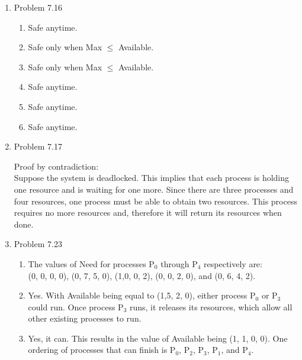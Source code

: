 \documentclass[a4paper,11pt]{article}
\theoremstyle{mytheor}
\begin{document}
\begin{enumerate}
\pagebreak
\item {Problem 7.16}
    \par 
    \begin{enumerate}
    \item Safe anytime.
    \item Safe only when Max $\leq$ Available.
    \item Safe only when Max $\leq$ Available.
    \item Safe anytime.
    \item Safe anytime.
    \item Safe anytime.
    \end{enumerate}
\item{Problem 7.17}    
    \par 
    Proof by contradiction:\\
    Suppose the system is deadlocked. This implies that each process is holding one resource and is waiting for one more. Since there are three processes and four resources, one process must be able to obtain two resources. This process requires no more resources and, therefore it will return its resources when done. 

\item{Problem 7.23}
    \begin{enumerate}
    \item The values of Need for processes P$_0$ through P$_4$ respectively are: 
    \\(0, 0, 0, 0), (0, 7, 5, 0),  (1,0, 0, 2), (0, 0, 2, 0), and (0, 6, 4, 2). 
    
    \item Yes. With Available being equal to (1,5, 2, 0), either process P$_0$ or P$_3$ could run. Once process P$_3$ runs, it releases its resources, which allow all other existing processes to run. 

    \item Yes, it can. This results in the value of Available being (1, 1, 0, 0). One ordering of processes that can finish is P$_0$, P$_2$, P$_3$, P$_1$, and P$_4$. 

    \end{enumerate}
    

\end{enumerate}
\end{document}
